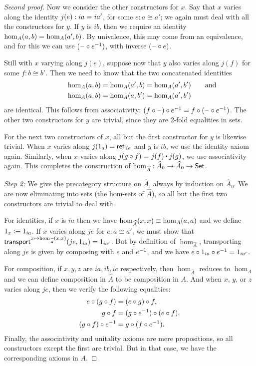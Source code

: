 \begin{proof}[Second proof]
  Now we consider the other constructors for $x$.
  Say that $x$ varies along the identity $j(e):ia =_{} ia'$, for some $e:a \cong a'$; we again must deal with all the constructors for $y$.
  If $y$ is $ib$, then we require an identity $\hom_A(a,b) =_{} \hom_A(a',b)$.
  By univalence, this may come from an equivalence, and for this we can use $(\mathord{\hspace{1pt}\text{--}\hspace{1pt}}\circ {e}^{-1})$, with inverse $(\mathord{\hspace{1pt}\text{--}\hspace{1pt}}\circ e)$.

  Still with $x$ varying along $j(e)$, suppose now that $y$ also varies along $j(f)$ for some $f:b\cong b'$.
  Then we need to know that the two concatenated identities
  \begin{gather*}
    \hom_A(a,b) = \hom_A(a',b) = \hom_A(a',b') \mathrlap{\qquad\text{and}}\\
    \hom_A(a,b) = \hom_A(a,b') = \hom_A(a',b')
  \end{gather*}
  are identical.
  This follows from associativity: $(f\circ \mathord{\hspace{1pt}\text{--}\hspace{1pt}})\circ {e}^{-1} = f\circ (\mathord{\hspace{1pt}\text{--}\hspace{1pt}}\circ {e}^{-1})$.
  The other two constructors for $y$ are trivial, since they are 2-fold equalities in sets.

  For the next two constructors of $x$, all but the first constructor for $y$ is likewise trivial.
  When $x$ varies along $j(1_a)=\mathsf{refl}_{ia}$ and $y$ is $ib$, we use the identity axiom again.
  Similarly, when $x$ varies along $\id{j(g\circ f)}{j(f)\ct j(g)}$, we use associativity again.
  This completes the construction of $\hom_{\widehat A}:\widehat A_0 \to \widehat A_0 \to \mathsf{Set}$.

  \mentalpause

  \emph{Step 2:} We give the precategory structure on $\widehat A$, always by induction on $\widehat A_0$.
  We are now eliminating into sets (the hom-sets of $\widehat A$), so all but the first two constructors are trivial to deal with.

  For identities, if $x$ is $ia$ then we have $\hom_{\widehat A}(x,x) \equiv \hom_A(a,a)$ and we define $1_x \vcentcolon\equiv 1_{ia}$.
  If $x$ varies along $je$ for $e:a\cong a'$, we must show that $\mathsf{transport}^{x\mapsto \hom_{\widehat A}(x,x)}(je,1_{ia}) = 1_{ia'}$.
  But by definition of $\hom_{\widehat A}$, transporting along $je$ is given by composing with $e$ and ${e}^{-1}$, and we have $e\circ 1_{ia} \circ {e}^{-1} = 1_{ia'}$.

  For composition, if $x,y,z$ are $ia,ib,ic$ respectively, then $\hom_{\widehat A}$ reduces to $\hom_A$ and we can define composition in $\widehat A$ to be composition in $A$.
  And when $x$, $y$, or $z$ varies along $je$, then we verify the following equalities:
  \begin{align*}
    e \circ (g\circ f) &= (e\circ g) \circ f,\\
    g\circ f &= (g\circ {e}^{-1}) \circ (e\circ f),\\
    (g\circ f) \circ {e}^{-1} &= g \circ (f\circ {e}^{-1}).
  \end{align*}
  Finally, the associativity and unitality axioms are mere propositions, so all constructors except the first are trivial.
  But in that case, we have the corresponding axioms in $A$.


\end{proof}
